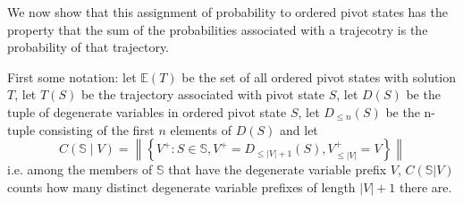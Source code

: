 \documentclass{article}
\begin{document}
We now show that this assignment of probability to ordered pivot states has the property that the sum of the probabilities associated with a trajecotry is the probability of that trajectory.

First some notation: let $\mathbb{E}(T)$ be the set of all ordered pivot states with solution $T$, let $T(S)$ be the trajectory associated with pivot state $S$, let $D(S)$ be the tuple of degenerate variables in ordered pivot state $S$, let $D_{\le n}(S)$ be the n-tuple consisting of the first $n$ elements of $D(S)$ and let
\begin{equation}
C(\mathbb{S} \mid V) = \left\|\left\{ V^+ :  S \in \mathbb{S}, V^+ = D_{\le |V|+1}(S), V^+_{\le |V|}=V \right\}\right\|
\label{count}
\end{equation}
i.e. among the members of $\mathbb{S}$ that have the degenerate variable prefix $V$, $C(\mathbb{S}|V)$ counts how many distinct degenerate variable prefixes of length $|V|+1$ there are.
\end{document}
